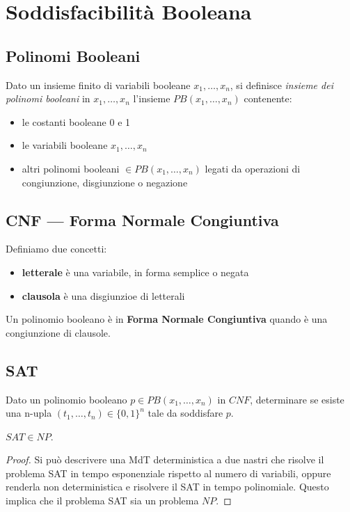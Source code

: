\section{Soddisfacibilità Booleana}

\subsection{Polinomi Booleani}

Dato un insieme finito di variabili booleane $x_1, \ldots, x_n$, si definisce \textit{insieme dei polinomi booleani} in $x_1, \ldots, x_n$ l'insieme $PB(x_1, \ldots, x_n)$ contenente:
\begin{itemize}
	\item le costanti booleane 0 e 1
	\item le variabili booleane $x_1, \ldots, x_n$
	\item altri polinomi booleani $\in PB(x_1, \ldots, x_n)$ legati da operazioni di congiunzione, disgiunzione o negazione
\end{itemize}

\subsection{CNF --- Forma Normale Congiuntiva}

Definiamo due concetti:
\begin{itemize}
	\item \textbf{letterale} è una variabile, in forma semplice o negata
	\item \textbf{clausola} è una disgiunzioe di letterali
\end{itemize}

\begin{defn}
	Un polinomio booleano è in \textbf{Forma Normale Congiuntiva} quando è una congiunzione di clausole.
\end{defn}

\subsection{SAT}

Dato un polinomio booleano $p \in PB(x_1, \ldots, x_n)$ in $CNF$, determinare se esiste una n-upla $(t_1, \ldots, t_n) \in \{0, 1\}^n$ tale da soddisfare $p$.

\begin{lemm}
	$SAT \in NP$.
\end{lemm}

\begin{proof}
	Si può descrivere una MdT deterministica a due nastri che risolve il problema SAT in tempo esponenziale rispetto al numero di variabili, oppure renderla non deterministica e risolvere il SAT in tempo polinomiale. Questo implica che il problema SAT sia un problema $NP$.
\end{proof}

